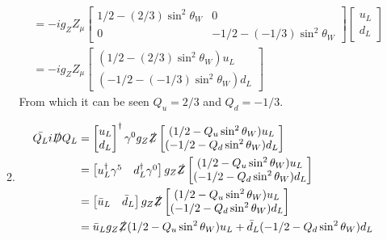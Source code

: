 \documentclass[12pt,a4]{article}
\begin{document}
\begin{enumerate}
\begin{enumerate}
\begin{align*}
                     &= - ig_Z Z_\mu \left[\begin{matrix} 1/2 - (2 / 3)\sin^2 \theta_W& 0 \\ 0 & -1/2 - (-1/3)\sin^2 \theta_W\end{matrix}\right]  \left[\begin{matrix} u_L \\ d_L\end{matrix}\right]\\
                     &= - ig_Z Z_\mu \left[\begin{matrix} (1/2 - (2 / 3)\sin^2 \theta_W) u_L \\ (-1/2 - (-1/3) \sin^2 \theta_W) d_L \end{matrix}  \right] 
        \end{align*}
        From which it can be seen $Q_u = 2 / 3$ and $Q_d = - 1 / 3$.
      \item
        \begin{align*}
          \bar{Q_L} i \slashed{D} Q_L &= \left[\begin{matrix} u_L \\ d_L\end{matrix}\right]^\dagger \gamma^0 g_Z \slashed{Z} \left[\begin{matrix} (1/2 - Q_u\sin^2 \theta_W) u_L \\ (-1/2 - Q_d \sin^2 \theta_W) d_L \end{matrix}  \right] \\
                                      &= \left[\begin{matrix} u_L^\dagger\gamma^5 & d_L^\dagger \gamma^0 \end{matrix}\right]  g_Z \slashed{Z} \left[\begin{matrix} (1/2 - Q_u\sin^2 \theta_W) u_L \\ (-1/2 - Q_d \sin^2 \theta_W) d_L \end{matrix}  \right] \\
                                      &= \left[\begin{matrix} \bar{u}_L & \bar{d}_L \end{matrix}\right]  g_Z \slashed{Z} \left[\begin{matrix} (1/2 - Q_u\sin^2 \theta_W) u_L \\ (-1/2 - Q_d \sin^2 \theta_W) d_L \end{matrix}  \right] \\
                                      &= \bar{u}_L g_Z \slashed{Z}  (1/2 - Q_u\sin^2 \theta_W) u_L + \bar{d}_L  (- 1/2 - Q_d \sin^2 \theta_W) d_L \\

\end{align*}
\end{enumerate}
\end{enumerate}
\end{document}
